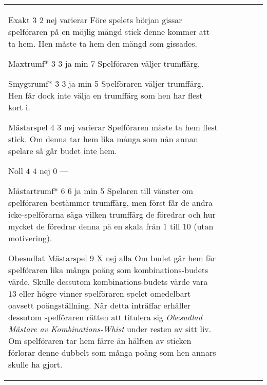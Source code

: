 \begin{table}
\begin{center}
\begin{tabularx}{\textwidth}{lcccc|X}
				\standardBidItem%
				{Exakt}
				{$3$}
				{$2$}
				{nej}
				{varierar}
				{%
					Före spelets början gissar spelföraren på en möjlig mängd stick denne kommer att ta hem. Hen måste ta hem den mängd som gissades.
				}

				\standardBidItem%
				{Maxtrumf*}
				{$3$}
				{$3$}
				{ja}
				{min 7}
				{%
					Spelföraren väljer trumffärg.
				}

				\standardBidItem%
				{Smygtrumf*}
				{$3$}
				{$3$}
				{ja}
				{min 5}
				{%
					Spelföraren väljer trumffärg. Hen får dock inte välja en trumffärg som hen har flest kort i.
				}

				\standardBidItem%
				{Mästarspel}
				{$4$}
				{$3$}
				{nej}
				{varierar}
				{%
					Spelföraren måste ta hem flest stick. Om denna tar hem lika många som nån annan spelare så går budet inte hem.
				}

				\standardBidItem%
				{Noll}
				{$4$}
				{$4$}
				{nej}
				{0}
				{%
					---
				}

				\standardBidItem%
				{Mästartrumf*}
				{$6$}
				{$6$}
				{ja}
				{min 5}
				{%
					Spelaren till vänster om spelföraren bestämmer trumffärg, men först får de andra icke-spelförarna säga vilken trumffärg de föredrar och hur mycket de föredrar denna på en skala från $1$ till $10$ (utan motivering).
				}

				\standardBidItem%
				{Obesudlat Mästarspel}
				{$9$}
				{X}
				{nej}
				{alla}
				{%
					Om budet går hem får spelföraren lika många poäng som kombinations-budets värde. Skulle dessutom kombinations-budets värde vara $13$ eller högre vinner spelföraren spelet omedelbart oavsett poängställning. När detta inträffar erhåller dessutom spelföraren rätten att titulera sig \emph{Obesudlad Mästare av Kombinations-Whist} under resten av sitt liv. Om spelföraren tar hem färre än hälften av sticken förlorar denne dubbelt som många poäng som hen annars skulle ha gjort.
				}
		\end{tabularx}
	\end{center}
\end{table}
